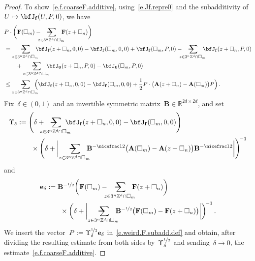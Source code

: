 \documentclass[11pt,twoside]{article} %
\makeatletter
\let\oldsquare\square %
\renewcommand{\square}{\oldsquare}
\numberwithin{equation}{section}
\theoremstyle{definition}
\newcommand*{\Z}{\ensuremath{\mathbb{Z}}}
\newcommand*{\R}{\ensuremath{\mathbb{R}}}
\newcommand{\f}{\mathbf{f}}
\newcommand{\bfzero}{\boldsymbol{0}}
\newcommand{\cu}{\square}
\newcommand{\avsum}{\mathop{\mathpalette\avsuminner\relax}\displaylimits}
\newcommand\avsuminner[2]{%
  {\sbox0{$\m@th#1\sum$}%
   \vphantom{\usebox0}%
   \ooalign{%
     \hidewidth
     \smash{\,\rule[.23em]{8.8pt}{1.1pt} \relax}%
     \hidewidth\cr
   ~$\m@th#1\sum$\cr
   }%
  }%
}
\newcommand{\bfA}{\mathbf{A}}
\newcommand{\bfF}{\mathbf{F}}
\makeatother
\begin{document}
\begin{proof}
To show~\eqref{e.f.coarseF.additive}, using~\eqref{e.Jf.repre0} and the subadditivity of~$U \mapsto \bfJ_{\f}(U, P,0)$, we have 
\begin{align}
\label{e.weird.F.subadd.def}
\lefteqn{
 P\cdot \biggl(  \bfF(\cu_m) - \!\!\!\! \avsum_{z \in 3^n \Z^d \cap \cu_m} \!\!\!\! \bfF(z+\cu_n)  \biggr) 
} & \qquad 
\notag \\  & = \avsum_{z \in 3^n \Z^d \cap \cu_m} \!\!\!\! \bfJ_{\f}(z+\cu_n, 0,0)  - \bfJ_{\f}(\cu_m, 0,0) 
+  \bfJ_{\f}(\cu_m, P,0)  - \!\!\!\! \avsum_{z \in 3^n \Z^d \cap \cu_m} \!\!\!\! \bfJ_{\f}(z+\cu_n, P,0) 
\notag \\ & \qquad 
+ \avsum_{z \in 3^n \Z^d \cap \cu_m} \!\!\!\! \bfJ_{\bfzero}(z+\cu_n, P,0)  - \bfJ_{\bfzero}(\cu_m, P,0)  
\notag \\ &
\leq
\avsum_{z \in 3^n \Z^d \cap \cu_m} \!\!\!\! \Bigl( \bfJ_{\f}(z+\cu_n, 0,0)  - \bfJ_{\f}(\cu_m, 0,0)   +  \frac12 P\cdot \bigl( \bfA(z+\cu_n) - \bfA(\cu_m) \bigr)P\Bigr)  \,.
\end{align}
Fix~$\delta \in (0,1)$ and an invertible symmetric matrix~$\mathbf{B} \in \R^{2d \times 2d}$, and set
\begin{align*} 
\Upsilon_\delta & := \Biggl(\delta + \! \! \! \! \! \avsum_{z \in 3^n \Z^d \cap \cu_m} \!\!\!\! \! \!\bfJ_{\f}(z+\cu_n, 0,0)  - \bfJ_{\f}(\cu_m, 0,0)\Biggr) 
\notag \\ & \qquad  \times \Biggl(\delta + \biggl| \avsum_{z \in 3^n \Z^d \cap \cu_m} \!\!\!\!  \mathbf{B}^{-\nicefrac12} \bigl( \bfA(\cu_m) - \bfA(z+\cu_n) \bigr) \mathbf{B}^{-\nicefrac12}  \biggr| \Biggr)^{\! -1} 
\end{align*} 
and
\begin{align*} 
\mathbf{e}_\delta & :=  \mathbf{B}^{-\nicefrac12}\biggl( \bfF(\cu_m) - \!\!\!\! \avsum_{z \in 3^n \Z^d \cap \cu_m} \!\!\!\! \bfF(z+\cu_n) \biggr) 
\notag \\ & \qquad  \times  
\biggl( \delta + \biggl| \avsum_{z \in 3^n \Z^d \cap \cu_m} \!\!\!\!  \mathbf{B}^{-\nicefrac12} \bigl( \bfF(\cu_m) -  \bfF(z+\cu_n) \bigr) \biggr| \biggr)^{\! -1}
\,.
\end{align*} 
We insert the vector~$P :=  \Upsilon_\delta^{\nicefrac12}  \mathbf{e}_\delta$ in~\eqref{e.weird.F.subadd.def} and obtain, after dividing the resulting estimate from both sides by~$\Upsilon_\delta^{\nicefrac12}$ and sending~$\delta \to 0$, the estimate~\eqref{e.f.coarseF.additive}.  

\smallskip


\end{proof}
\end{document}
